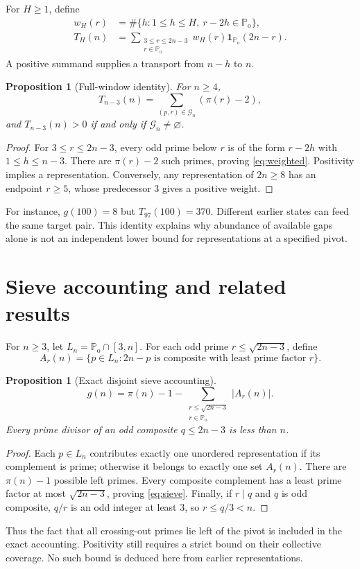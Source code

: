 \documentclass[11pt,a4paper]{article}
\newtheorem{proposition}[theorem]{Proposition}
\theoremstyle{definition}
\theoremstyle{remark}
\newcommand{\Po}{\mathbb P_{\mathrm{o}}}
\newcommand{\G}{\mathcal G}
\newcommand{\ind}{\mathbf 1}
\begin{document}
For $H\ge1$, define
\begin{align}
 w_H(r)&=\#\{h:1\le h\le H,\ r-2h\in\Po\},\\
 T_H(n)&=\sum_{\substack{3\le r\le2n-3\\r\in\Po}}
 w_H(r)\ind_{\Po}(2n-r).
\end{align}
A positive summand supplies a transport from $n-h$ to $n$.

\begin{proposition}[Full-window identity]\label{prop:weighted}
For $n\ge4$,
\begin{equation}\label{eq:weighted}
 T_{n-3}(n)=\sum_{(p,r)\in\G_n}(\pi(r)-2),
\end{equation}
and $T_{n-3}(n)>0$ if and only if $\G_n\ne\varnothing$.
\end{proposition}
\begin{proof}
For $3\le r\le2n-3$, every odd prime below $r$ is of the form $r-2h$ with $1\le h\le n-3$. There are $\pi(r)-2$ such primes, proving \eqref{eq:weighted}. Positivity implies a representation. Conversely, any representation of $2n\ge8$ has an endpoint $r\ge5$, whose predecessor $3$ gives a positive weight.
\end{proof}
For instance, $g(100)=8$ but $T_{97}(100)=370$. Different earlier states can feed the same target pair. This identity explains why abundance of available gaps alone is not an independent lower bound for representations at a specified pivot.

\section{Sieve accounting and related results}
For $n\ge3$, let $L_n=\Po\cap[3,n]$. For each odd prime $r\le\sqrt{2n-3}$, define
\[
 A_r(n)=\{p\in L_n:2n-p\text{ is composite with least prime factor }r\}.
\]
\begin{proposition}[Exact disjoint sieve accounting]
\begin{equation}\label{eq:sieve}
 g(n)=\pi(n)-1-\sum_{\substack{r\le\sqrt{2n-3}\\r\in\Po}}|A_r(n)|.
\end{equation}
Every prime divisor of an odd composite $q\le2n-3$ is less than $n$.
\end{proposition}
\begin{proof}
Each $p\in L_n$ contributes exactly one unordered representation if its complement is prime; otherwise it belongs to exactly one set $A_r(n)$. There are $\pi(n)-1$ possible left primes. Every composite complement has a least prime factor at most $\sqrt{2n-3}$, proving \eqref{eq:sieve}. Finally, if $r\mid q$ and $q$ is odd composite, $q/r$ is an odd integer at least $3$, so $r\le q/3<n$.
\end{proof}
Thus the fact that all crossing-out primes lie left of the pivot is included in the exact accounting. Positivity still requires a strict bound on their collective coverage. No such bound is deduced here from earlier representations.
\end{document}
